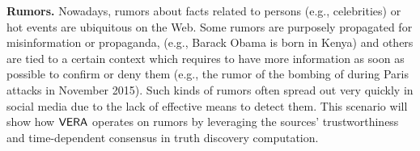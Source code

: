 \textbf{Rumors.} Nowadays, rumors about facts related to persons (e.g., celebrities) or hot events are ubiquitous on the Web.
Some rumors are purposely propagated for misinformation or propaganda, (e.g., Barack Obama is born in Kenya) and others are tied to a certain context which requires to have more information as soon as possible to confirm or deny them (e.g., the rumor of the bombing of  during Paris attacks in November 2015). Such kinds of rumors often spread out very quickly in  social media due to the lack of effective means to detect them. This scenario will show how $\mathsf{VERA}$ operates on rumors  by leveraging the sources' trustworthiness and time-dependent consensus in truth discovery computation.

